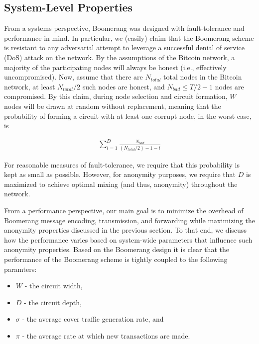 \subsection{System-Level Properties}
From a systems perspective, Boomerang was designed with fault-tolerance and performance in mind. In particular, we (easily) claim that the Boomerang scheme is resistant to any adversarial attempt to leverage a successful denial of service (DoS) attack on the network. By the assumptions of the Bitcoin network, a majority of the participating nodes will always be honest (i.e., effectively uncompromised). Now, assume that there are $N_{total}$ total nodes in the Bitcoin network, at least $N_{total}/2$ such nodes are honest, and $N_{bad} \leq T/2 - 1$ nodes are compromised. By this claim, during node selection and circuit formation, $W$ nodes will be drawn at random without replacement, meaning that the probability of forming a circuit with at least one corrupt node, in the worst case, is

\begin{align*}
\sum_{i=1}^D \frac{N_{bad}}{(N_{total}/2) - 1 - i}
\end{align*}

For reasonable measures of fault-tolerance, we require that this probability is kept as small as possible. However, for anonymity purposes, we require that $D$ is maximized to achieve optimal mixing (and thus, anonymity) throughout the network. 


From a performance perspective, our main goal is to minimize the overhead of Boomerang message encoding, transmission, and forwarding while maximizing the anonymity properties discussed in the previous section. To that end, we discuss how the performance varies based on system-wide parameters that influence such anonymity properties. Based on the Boomerang design it is clear that the performance of the Boomerang scheme is tightly coupled to the following paramters:
\begin{itemize}
	\item $W$ - the circuit width,
	\item $D$ - the circuit depth,
	\item $\sigma$ - the average cover traffic generation rate, and
	\item $\pi$ - the average rate at which new transactions are made.
\end{itemize}

